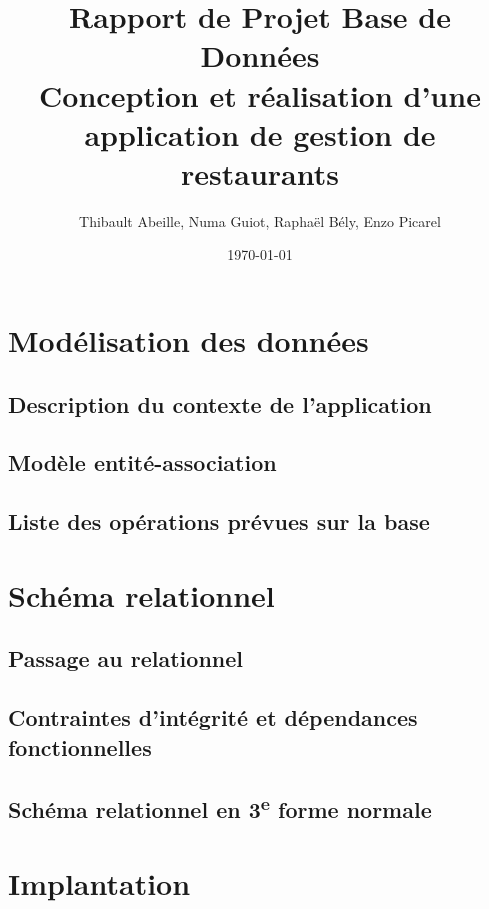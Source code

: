 \documentclass[a4paper, 12pt]{article}
\title{\textbf{Rapport de Projet Base de Données}\\ \large Conception et réalisation d'une application de gestion de restaurants}
\author{Thibault Abeille, Numa Guiot, Raphaël Bély, Enzo Picarel}
\date{\today}
\begin{document}
\maketitle
\thispagestyle{empty}
\newpage


\tableofcontents
\newpage


\section{Modélisation des données}

    \subsection{Description du contexte de l’application}
    

    \subsection{Modèle entité-association}
    
    \subsection{Liste des opérations prévues sur la base}
   


\section{Schéma relationnel}

    \subsection{Passage au relationnel}
    

    \subsection{Contraintes d’intégrité et dépendances fonctionnelles}
    

    \subsection{Schéma relationnel en 3\textsuperscript{e} forme normale}
    


\section{Implantation}
\end{document}
